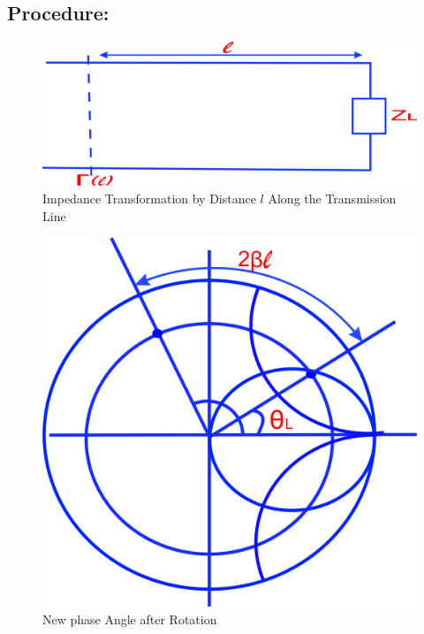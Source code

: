 \subsection*{Procedure:}
\begin{figure}[h]
\centering
\includegraphics[width=0.7\linewidth]{./graphics/wertuyuk}
\caption{Impedance Transformation by Distance $l$ Along the Transmission Line}
\label{fig:wertuyuk}
\end{figure}
\begin{figure}[h]
\centering
\includegraphics[width=0.5\linewidth]{./graphics/uyhbgjvkclxse}
\caption{New phase Angle after Rotation}
\label{fig:uyhbgjvkclxse}
\end{figure}

